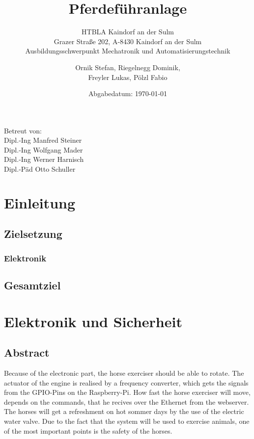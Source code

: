 \documentclass[12pt]{scrartcl}
\title{Pferdeführanlage \\ }
\subtitle{HTBLA Kaindorf an der Sulm \\ Grazer Straße 202, A-8430 Kaindorf an der Sulm \\ Ausbildungsschwerpunkt Mechatronik und Automatisierungstechnik}
\author{Ornik Stefan, Riegelnegg Dominik, \\ Freyler Lukas, Pölzl Fabio}
\date{Abgabedatum: \today{}}
\begin{document}
\maketitle
\vfill
\begin{center} 
Betreut von:\\Dipl.-Ing Manfred Steiner\\Dipl.-Ing Wolfgang Mader\\Dipl.-Ing Werner Harnisch\\Dipl.-Päd Otto Schuller
\end{center}
\newpage

\tableofcontents
\newpage
\section{Einleitung}
\label{sec:einleitung}

\subsection{Zielsetzung}
\label{sec:zielsetzung}

\subsubsection{Elektronik}
\label{sec:elektronik}

\subsection{Gesamtziel}
\label{sec:gesamtziel}
\newpage
\section{Elektronik und Sicherheit}
\label{sec:elektronikUndSicherheit}

\subsection{Abstract}
\label{sec:abstract}

Because of the electronic part, the horse exerciser should be able to rotate. 
The actuator of the engine is realised by a frequency converter, which gets the signals from the GPIO-Pins on the Raspberry-Pi.
How fast the horse exerciser will move, depends on the commands, that he recives over the Ethernet from the webserver.
The horses will get a refreshment on hot sommer days by the use of the electric water valve.
Due to the fact that the system will be used to exercise animals, one of the most important points is the safety of the horses.
\end{document}

